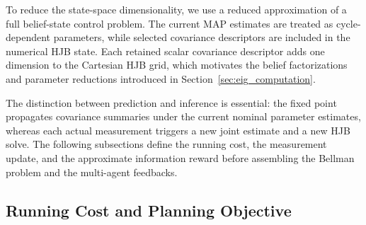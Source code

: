 \documentclass{article}
\begin{document}
To reduce the state-space dimensionality, we use a reduced approximation of a full belief-state control problem.
The current MAP estimates are treated as cycle-dependent parameters, while selected covariance descriptors are included in the numerical HJB state.
Each retained scalar covariance descriptor adds one dimension to the Cartesian HJB grid, which motivates the belief factorizations and parameter reductions introduced in Section~\ref{sec:eig_computation}.

The distinction between prediction and inference is essential: the fixed point propagates covariance summaries under the current nominal parameter estimates, whereas each actual measurement triggers a new joint estimate and a new HJB solve.
The following subsections define the running cost, the measurement update, and the approximate information reward before assembling the Bellman problem and the multi-agent feedbacks.

\subsection{Running Cost and Planning Objective}
\label{sec:running_cost}
\end{document}
